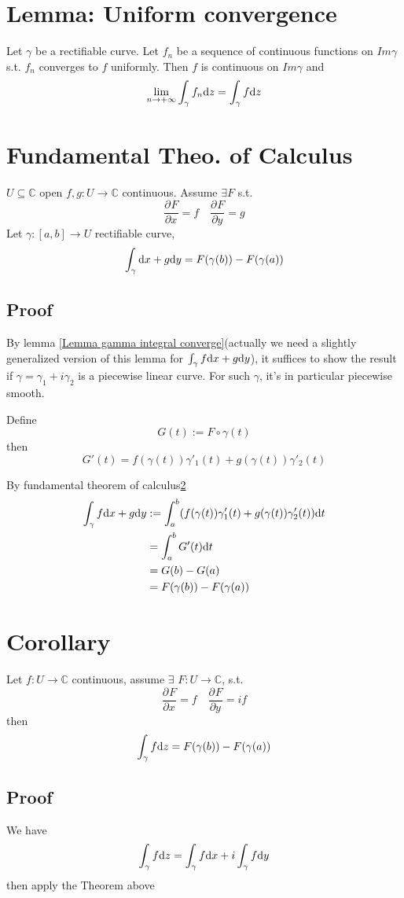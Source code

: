 \documentclass{book}
\newcommand{\fpart}[3][]{\frac{\partial^{#1}#2}{\partial #3^{#1}}}
\begin{document}
\section{Lemma: Uniform convergence}
Let $\gamma$ be a rectifiable curve. Let $f_n$ be a sequence of continuous functions on $Im\gamma$ s.t. $f_n$ converges to $f$ uniformly. Then $f$ is continuous on $Im\gamma$ and $$\lim\limits_{n\to +\infty}\int_\gamma f_n\text dz=\int_\gamma f\text dz$$
\section{Fundamental Theo. of Calculus}
\label{fundamental theorem of calculus}
$U\subseteq \mathbb C $ open $f,g:U\to \mathbb C$ continuous. Assume $\exists F$ s.t. $$\fpart{F}{x}=f\quad\fpart{F}{y}=g$$
Let $\gamma:[a,b]\to U$ rectifiable curve,$$\int_\gamma\text d{x}+g\text d y=F(\gamma(b))-F(\gamma(a))$$
\subsection*{Proof}
By lemma \ref{Lemma gamma integral converge}(actually we need a slightly generalized version of this lemma for $\int_\gamma f\text dx+g\text dy$), it suffices to show the result if $\gamma=\gamma_1+i\gamma_2$ is a piecewise linear curve. For such $\gamma$, it's in particular piecewise smooth.

Define $$G(t):=F\circ \gamma(t)$$ then $$G'(t)=f(\gamma(t))\gamma'_1(t)+g(\gamma(t))\gamma'_2(t)$$

By fundamental theorem of calculus\ref{fundamental theorem of calculus}
$$\begin{aligned}
    \int_\gamma f\text dx+ g\text dy&:=\int_a^b(f(\gamma(t))\gamma'_1(t)+g(\gamma(t))\gamma'_2(t))\text dt\\
    &=\int_a^b G'(t)\text dt\\
    &=G(b)-G(a)\\
    &=F(\gamma(b))-F(\gamma(a))
\end{aligned}$$
\section{Corollary}
Let $f:U\to \mathbb C$ continuous, assume $\exists$ $F:U\to \mathbb C$, s.t. $$\fpart{F}{x}=f\quad \fpart{F}{y}=if$$
then 
$$\int_\gamma f\text dz=F(\gamma(b))-F(\gamma(a))$$
\subsection*{Proof}
We have $$\int_\gamma f\text dz=\int_\gamma f\text dx+i\int_\gamma f\text dy$$then apply the Theorem above
\end{document}
